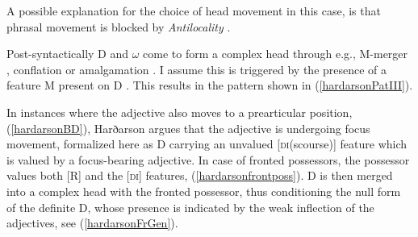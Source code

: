 \documentclass[output=paper,colorlinks,citecolor=brown,
]{langscibook}
\begin{document}
\noindent A possible explanation for the choice of head movement in this case, is that phrasal movement is blocked by \textit{Antilocality} \citep[e.g.,][]{Grohmann:2000td,abels2003}.

Post-syntactically D and $\omega$ come to form a complex head through e.g., M-merger \citep{Marantz:1988ug,Matushanski:2006ud}, conflation \citep{Harley:2004ue} or amalgamation \citep{Harizanov:2018ep}. I assume this is triggered by the presence of a feature M present on D \citep[cf.][]{Harley:2004ue,Harizanov:2018ep}. This results in the pattern shown in (\ref{hardarsonPatIII}).

\begin{exe}
\end{exe}

In instances where the adjective also moves to a prearticular position, (\ref{hardarsonBD}), Harðarson \citeyearpar[147ff]{Hardarson:2016wd} argues that the adjective is undergoing focus movement, formalized here as D carrying an unvalued [\textsc{di}(scourse)] feature which is valued by a focus-bearing adjective. In case of fronted possessors, the possessor values both [R] and the [\textsc{di}] features, (\ref{hardarsonfrontposs}). D is then merged into a complex head with the fronted possessor, thus conditioning the null form of the definite D, whose presence is indicated by the weak inflection of the adjectives, see (\ref{hardarsonFrGen}).
\end{document}
